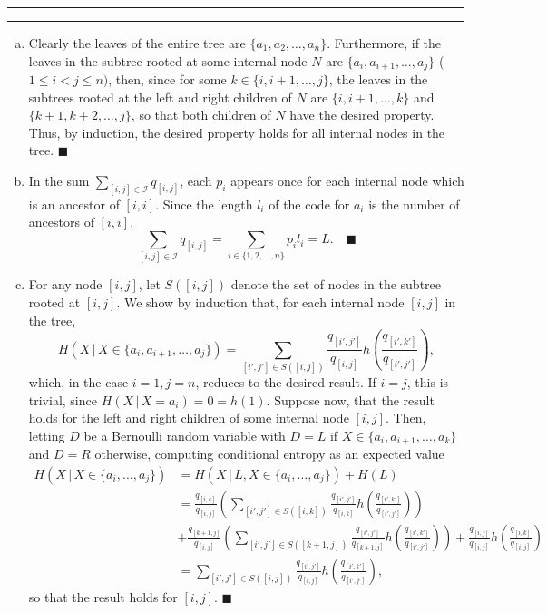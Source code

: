 \documentclass[11pt]{article}
\newcounter{questionCounter}
\newcounter{partCounter}[questionCounter]
\newenvironment{question}[2][\arabic{questionCounter}]{%
    \setcounter{partCounter}{0}%
    \vspace{.25in} \hrule \vspace{0.5em}%
        \noindent{\bf #2}%
    \vspace{0.8em} \hrule \vspace{.10in}%
    \addtocounter{questionCounter}{1}%
}{}
\renewcommand{\qed}{\quad $\blacksquare$}
\newcommand{\mqed}{\quad \blacksquare}
\newcommand{\I}{\mathcal{I}}
\newcommand{\pr}[1]{\mathsf{P}\left( #1 \right)} %
\newcommand{\giv}{\, | \,} %
\begin{document}
\begin{question}{Problem 5}
\begin{enumerate}[(a)]
\item
Clearly the leaves of the entire tree are $\{a_1,a_2,\dots,a_n\}$. Furthermore,
if the leaves in the subtree rooted at some internal node $N$ are $\{a_i,a_{i +
1},\dots,a_j\}$ ($1 \leq i < j \leq n)$, then, since for some $k \in \{i,i + 1,
\dots,j\}$, the leaves in the subtrees rooted at the left and right children of
$N$ are $\{i,i + 1,\dots,k\}$ and $\{k + 1,k + 2,\dots,j\}$, so that both
children of $N$ have the desired property. Thus, by induction, the desired
property holds for all internal nodes in the tree. \qed

\item In the sum $\sum_{[i,j] \in \I} q_{[i,j]}$, each $p_i$ appears once for
each internal node which is an ancestor of $[i,i]$. Since the length $l_i$ of
the code for $a_i$ is the number of ancestors of $[i,i]$,
\[\sum_{[i,j] \in \I} q_{[i,j]}
 = \sum_{i \in \{1,2,\ldots,n\}} p_il_i
 = L. \mqed
 \]

\item
For any node $[i,j]$, let $S([i,j])$ denote the set of nodes in the
subtree rooted at $[i,j]$. We show by induction that, for each internal node
$[i,j]$ in the tree,
\[
 H(X \giv X \in \{a_i,a_{i + 1},\dots,a_j\})
 =  \sum_{[i',j'] \in S([i,j])}
    \frac{q_{[i',j']}}{q_{[i,j]}} 
    h\left(\frac{q_{[i',k']}}{q_{[i',j']}} \right),
\]
which, in the case $i = 1, j = n$, reduces to the desired result. If $i = j$,
this is trivial, since $H(X \giv X = a_i) = 0 = h(1)$. Suppose now, that the
result holds for the left and right children of some internal node $[i,j]$.
Then, letting $D$ be a Bernoulli random variable with $D = L$ if $X \in
\{a_i,a_{i + 1},\dots,a_k\}$ and $D = R$ otherwise, computing conditional
entropy as an expected value
\begin{align*}
 H(X \giv X \in \{a_i,\dots,a_j\})
 & = H(X \giv L, X \in \{a_i,\dots,a_j\}) + H(L) \\
 & = \frac{q_{[i,k]}}{q_{[i,j]}}
     \left( \sum_{[i',j'] \in S([i,k])}\frac{q_{[i',j']}}{q_{[i,k]}}
     h\left(\frac{q_{[i',k']}}{q_{[i',j']}}\right)\right) \\
 & + \frac{q_{[k + 1,j]}}{q_{[i,j]}}
     \left(\sum_{[i',j'] \in S([k + 1,j])}
     \frac{q_{[i',j']}}{q_{[k + 1,j]}} h\left(\frac{q_{[i',k']}}{q_{[i',j']}}\right)\right)
   + \frac{q_{[i,j]}}{q_{[i,j]}} h\left( \frac{q_{[i,k]}}{q_{[i,j]}} \right) \\
 & = \sum_{[i',j'] \in S([i,j])}
     \frac{q_{[i',j']}}{q_{[i,j]}} 
     h\left(\frac{q_{[i',k']}}{q_{[i',j']}} \right),
\end{align*}
so that the result holds for $[i,j]$. \qed


\end{enumerate}
\end{question}
\end{document}
